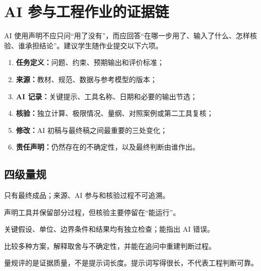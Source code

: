 \chapter{AI 参与工程作业的证据链}

AI 使用声明不应只问“用了没有”，而应回答“在哪一步用了、输入了什么、怎样核验、谁承担结论”。建议学生随作业提交以下六项。

\begin{enumerate}
  \item \textbf{任务定义：}问题、约束、预期输出和评价标准；
  \item \textbf{来源：}教材、规范、数据与参考模型的版本；
  \item \textbf{AI 记录：}关键提示、工具名称、日期和必要的输出节选；
  \item \textbf{核验：}独立计算、极限情况、量纲、对照案例或第二工具复核；
  \item \textbf{修改：}AI 初稿与最终稿之间最重要的三处变化；
  \item \textbf{责任声明：}仍然存在的不确定性，以及最终判断由谁作出。
\end{enumerate}

\section*{四级量规}

\begin{description}[style=nextline,leftmargin=2.2cm]
  \item[不足] 只有最终成品；来源、AI 参与和核验过程不可追溯。
  \item[基本] 声明工具并保留部分过程，但核验主要停留在“能运行”。
  \item[可靠] 关键假设、单位、边界条件和结果均有独立检查；能指出 AI 错误。
  \item[成熟] 比较多种方案，解释取舍与不确定性，并能在追问中重建判断过程。
\end{description}

量规评的是证据质量，不是提示词长度。提示词写得很长，不代表工程判断可靠。
